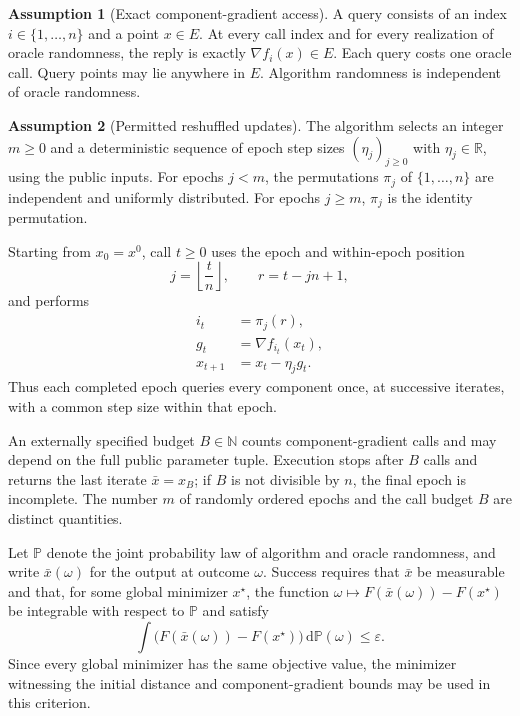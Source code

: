 \documentclass[10pt]{article}
\theoremstyle{definition}
\newtheorem{assumption}{Assumption}
\begin{document}
\begin{assumption}[Exact component-gradient access]
A query consists of an index $i\in\{1,\ldots,n\}$ and a point $x\in E$. At every call index and for every realization of oracle randomness, the reply is exactly $\nabla f_i(x)\in E$. Each query costs one oracle call. Query points may lie anywhere in $E$. Algorithm randomness is independent of oracle randomness.
\end{assumption}

\begin{assumption}[Permitted reshuffled updates]
The algorithm selects an integer $m\geq0$ and a deterministic sequence of epoch step sizes $(\eta_j)_{j\geq0}$ with $\eta_j\in\mathbb{R}$, using the public inputs. For epochs $j<m$, the permutations $\pi_j$ of $\{1,\ldots,n\}$ are independent and uniformly distributed. For epochs $j\geq m$, $\pi_j$ is the identity permutation.

Starting from $x_0=x^0$, call $t\geq0$ uses the epoch and within-epoch position
\[
j=\left\lfloor\frac{t}{n}\right\rfloor,
\qquad r=t-jn+1,
\]
and performs
\begin{align*}
i_t&=\pi_j(r),\\
g_t&=\nabla f_{i_t}(x_t),\\
x_{t+1}&=x_t-\eta_j g_t.
\end{align*}
Thus each completed epoch queries every component once, at successive iterates, with a common step size within that epoch.
\end{assumption}

An externally specified budget $B\in\mathbb{N}$ counts component-gradient calls and may depend on the full public parameter tuple. Execution stops after $B$ calls and returns the last iterate $\bar{x}=x_B$; if $B$ is not divisible by $n$, the final epoch is incomplete. The number $m$ of randomly ordered epochs and the call budget $B$ are distinct quantities.

Let $\mathbb{P}$ denote the joint probability law of algorithm and oracle randomness, and write $\bar{x}(\omega)$ for the output at outcome $\omega$. Success requires that $\bar{x}$ be measurable and that, for some global minimizer $x^\star$, the function $\omega\mapsto F(\bar{x}(\omega))-F(x^\star)$ be integrable with respect to $\mathbb{P}$ and satisfy
\[
\int \bigl(F(\bar{x}(\omega))-F(x^\star)\bigr)
\,\mathrm{d}\mathbb{P}(\omega)\leq\varepsilon.
\]
Since every global minimizer has the same objective value, the minimizer witnessing the initial distance and component-gradient bounds may be used in this criterion.
\end{document}
